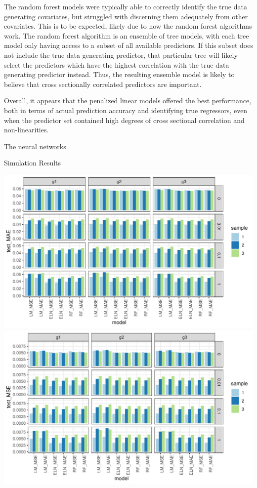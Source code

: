 \documentclass[a4paper, table]{article}
\begin{document}
The random forest models were typically able to correctly identify the true data generating covariates, but struggled with discerning them adequately from other covariates. This is to be expected, likely due to how the random forest algorithms work. The random forest algorithm is an ensemble of tree models, with each tree model only having access to a subset of all available predictors. If this subset does not include the true data generating predictor, that particular tree will likely select the predictors which have the highest correlation with the true data generating predictor instead. Thus, the resulting ensemble model is likely to believe that cross sectionally correlated predictors are important.

Overall, it appears that the penalized linear models offered the best performance, both in terms of actual prediction accuracy and identifying true regressors, even when the predictor set contained high degrees of cross sectional correlation and non-linearities. 

The neural networks

\begin{table}
	\caption{Simulation Results}
	\begin{center}
		\includegraphics{simulation_test_mae.pdf}
		\includegraphics{simulation_test_mse.pdf}
	\end{center}
\end{table}
\end{document}
